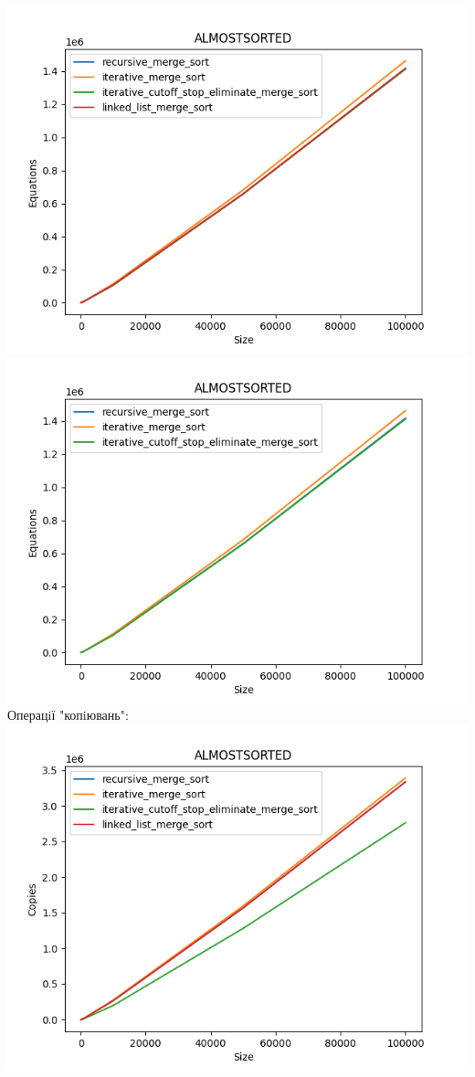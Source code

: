 \documentclass{article}
\begin{document}
        \includegraphics[scale=0.5]{almostsorted_Equations_4_sorts_6_numbers_50_100to100000.png}
        \includegraphics[scale=0.5]{almostsorted_Equations_3_sorts_6_numbers_50_100to100000.png}
    \newpage
    Операцiї "копiювань":
    \newline
        \includegraphics[scale=0.5]{almostsorted_Copies_4_sorts_6_numbers_50_100to100000.png}
\end{document}
